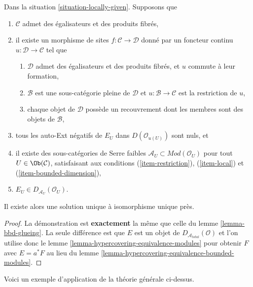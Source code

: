 \begin{lemma}
\label{lemma-bbd-unbounded-glueing}
Dans la situation \ref{situation-locally-given}. Supposons que
\begin{enumerate}
\item $\mathcal{C}$ admet des égalisateurs et des produits fibrés,
\item il existe un morphisme de sites $f : \mathcal{C} \to \mathcal{D}$
donné par un foncteur continu $u : \mathcal{D} \to \mathcal{C}$
tel que
\begin{enumerate}
\item $\mathcal{D}$ admet des égalisateurs et des produits fibrés, et $u$
commute à leur formation,
\item $\mathcal{B}$ est une sous-catégorie pleine de $\mathcal{D}$
et $u : \mathcal{B} \to \mathcal{C}$ est la restriction de $u$,
\item chaque objet de $\mathcal{D}$ possède un recouvrement dont les membres
sont des objets de $\mathcal{B}$,
\end{enumerate}
\item tous les auto-Ext négatifs de $E_U$ dans $D(\mathcal{O}_{u(U)})$ sont nuls, et
\item il existe des sous-catégories de Serre faibles
$\mathcal{A}_U \subset \textit{Mod}(\mathcal{O}_U)$ pour tout
$U \in \Ob(\mathcal{C})$, satisfaisant aux conditions (\ref{item-restriction}),
(\ref{item-local}) et (\ref{item-bounded-dimension}),
\item $E_U \in D_{\mathcal{A}_U}(\mathcal{O}_U)$.
\end{enumerate}
Il existe alors une solution unique à isomorphisme unique près.
\end{lemma}

\begin{proof}
La démonstration est {\bf exactement} la même que celle du
lemme \ref{lemma-bbd-glueing}. La seule différence est que
$E$ est un objet de $D_{\mathcal{A}_{total}}(\mathcal{O})$
et l'on utilise donc le lemme \ref{lemma-hypercovering-equivalence-modules}
pour obtenir $F$ avec $E = a^*F$
au lieu du lemme \ref{lemma-hypercovering-equivalence-bounded-modules}.
\end{proof}

\noindent
Voici un exemple d’application de la théorie générale ci-dessus.

